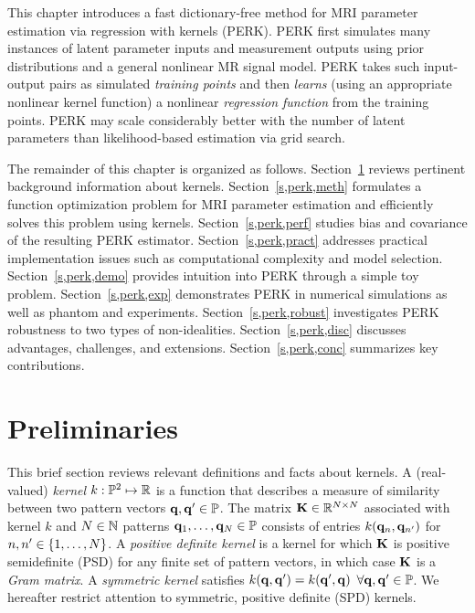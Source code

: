 This chapter introduces  
a fast dictionary-free method
for MRI parameter estimation
via regression with kernels (PERK).
PERK first simulates many instances
of latent parameter inputs
and measurement outputs
using prior distributions
and a general nonlinear MR signal model.
PERK takes such input-output pairs
as simulated \emph{training points}
and then \emph{learns}
(using an appropriate nonlinear kernel function)
a nonlinear \emph{regression function}
from the training points.
PERK may scale considerably better
with the number of latent parameters
than likelihood-based estimation 
via grid search.

The remainder of this chapter
is organized as follows.
Section~\ref{s,perk,rev} reviews 
pertinent background information about kernels. 
Section~\ref{s,perk,meth} formulates 
a function optimization problem
for MRI parameter estimation
and efficiently solves this problem 
using kernels.
Section~\ref{s,perk,perf} studies bias and covariance
of the resulting PERK estimator.
Section~\ref{s,perk,pract} addresses practical implementation issues
such as computational complexity and model selection.
Section~\ref{s,perk,demo} provides intuition into PERK
through a simple toy problem.
Section~\ref{s,perk,exp} demonstrates PERK
in numerical simulations
as well as phantom and \invivo experiments.
Section~\ref{s,perk,robust} investigates PERK robustness
to two types of non-idealities.
Section~\ref{s,perk,disc} discusses advantages,
challenges, and extensions.
Section~\ref{s,perk,conc} summarizes key contributions.

\section{Preliminaries}
\label{s,perk,rev}

This brief section reviews
relevant definitions and facts about kernels.
A (real-valued) \emph{kernel} 
$k : \mathbb{P}^2 \mapsto \mathbb{R}$
is a function 
that describes a measure of similarity
between two pattern vectors 
$\mathbf{q},\mathbf{q}' \in \mathbb{P}$.
The matrix $\mathbf{K} \in \mathbb{R}^{N \times N}$
associated with kernel $k$
and $N \in \mathbb{N}$ patterns $\mathbf{q}_1,\dots,\mathbf{q}_N \in \mathbb{P}$
consists of entries
$k\paren{\bmq_n,\bmq_{n'}}$
for $n,n' \in \set{1,\dots,N}$.
A \emph{positive definite kernel} is a kernel
for which $\mathbf{K}$ is positive semidefinite (PSD)
for any finite set of pattern vectors,
in which case $\mathbf{K}$
is a \emph{Gram matrix}.
A \emph{symmetric kernel} satisfies 
$k\paren{\bmq,\bmq'} = k\paren{\bmq',\bmq}$
$\forall \mathbf{q},\mathbf{q}' \in \mathbb{P}$.
We hereafter restrict attention
to symmetric, positive definite (SPD) kernels.

